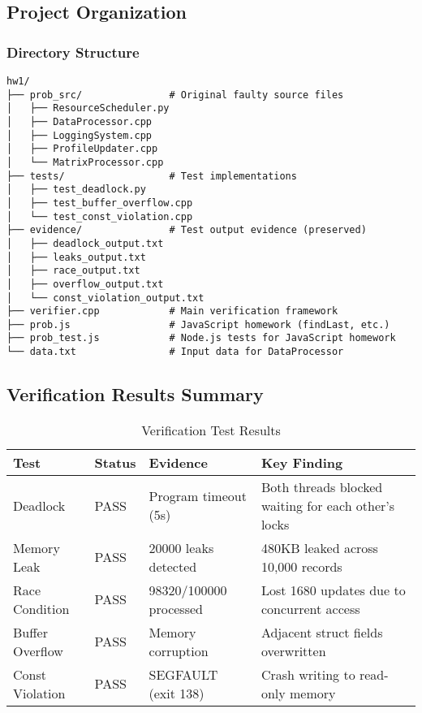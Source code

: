 \documentclass[11pt,a4paper]{article}
\begin{document}
\subsection{Project Organization}

\subsubsection{Directory Structure}

\begin{verbatim}
hw1/
├── prob_src/               # Original faulty source files
│   ├── ResourceScheduler.py
│   ├── DataProcessor.cpp
│   ├── LoggingSystem.cpp
│   ├── ProfileUpdater.cpp
│   └── MatrixProcessor.cpp
├── tests/                  # Test implementations
│   ├── test_deadlock.py
│   ├── test_buffer_overflow.cpp
│   └── test_const_violation.cpp
├── evidence/               # Test output evidence (preserved)
│   ├── deadlock_output.txt
│   ├── leaks_output.txt
│   ├── race_output.txt
│   ├── overflow_output.txt
│   └── const_violation_output.txt
├── verifier.cpp            # Main verification framework
├── prob.js                 # JavaScript homework (findLast, etc.)
├── prob_test.js            # Node.js tests for JavaScript homework
└── data.txt                # Input data for DataProcessor
\end{verbatim}

\subsection{Verification Results Summary}

\begin{table}[h]
\centering
\begin{tabular}{@{}lllp{5cm}@{}}
\toprule
\textbf{Test} & \textbf{Status} & \textbf{Evidence} & \textbf{Key Finding} \\ \midrule
Deadlock &  PASS & Program timeout (5s) & Both threads blocked waiting for each other's locks \\
Memory Leak &  PASS & 20000 leaks detected & 480KB leaked across 10,000 records \\
Race Condition &  PASS & 98320/100000 processed & Lost 1680 updates due to concurrent access \\
Buffer Overflow &  PASS & Memory corruption & Adjacent struct fields overwritten \\
Const Violation &  PASS & SEGFAULT (exit 138) & Crash writing to read-only memory \\ \bottomrule
\end{tabular}
\caption{Verification Test Results}
\end{table}
\end{document}
